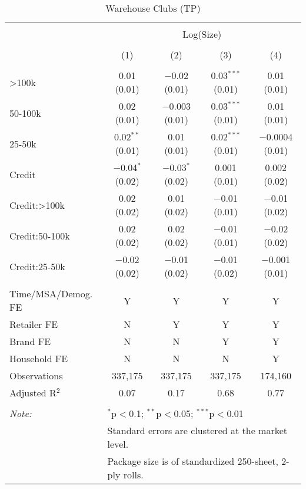 
\begin{table}[!htbp] \centering 
  \caption{Warehouse Clubs (TP)} 
  \label{tab:packageSizeWarehouseLiq} 
\begin{tabular}{@{\extracolsep{5pt}}lcccc} 
\\[-1.8ex]\hline 
\hline \\[-1.8ex] 
 & \multicolumn{4}{c}{Log(Size)} \\ 
\\[-1.8ex] & (1) & (2) & (3) & (4)\\ 
\hline \\[-1.8ex] 
 >100k & 0.01 (0.01) & $-$0.02 (0.01) & 0.03$^{***}$ (0.01) & 0.01 (0.01) \\ 
  50-100k & 0.02 (0.01) & $-$0.003 (0.01) & 0.03$^{***}$ (0.01) & 0.01 (0.01) \\ 
  25-50k & 0.02$^{**}$ (0.01) & 0.01 (0.01) & 0.02$^{***}$ (0.01) & $-$0.0004 (0.01) \\ 
  Credit & $-$0.04$^{*}$ (0.02) & $-$0.03$^{*}$ (0.02) & 0.001 (0.01) & 0.002 (0.02) \\ 
  Credit:>100k & 0.02 (0.02) & 0.01 (0.02) & $-$0.01 (0.01) & $-$0.01 (0.02) \\ 
  Credit:50-100k & 0.02 (0.02) & 0.02 (0.02) & $-$0.01 (0.01) & $-$0.02 (0.02) \\ 
  Credit:25-50k & $-$0.02 (0.02) & $-$0.01 (0.02) & $-$0.01 (0.02) & $-$0.001 (0.01) \\ 
 \hline \\[-1.8ex] 
Time/MSA/Demog. FE & Y & Y & Y & Y \\ 
Retailer FE & N & Y & Y & Y \\ 
Brand FE & N & N & Y & Y \\ 
Household FE & N & N & N & Y \\ 
Observations & 337,175 & 337,175 & 337,175 & 174,160 \\ 
Adjusted R$^{2}$ & 0.07 & 0.17 & 0.68 & 0.77 \\ 
\hline 
\hline \\[-1.8ex] 
\textit{Note:}  & \multicolumn{4}{l}{$^{*}$p$<$0.1; $^{**}$p$<$0.05; $^{***}$p$<$0.01} \\ 
 & \multicolumn{4}{l}{Standard errors are clustered at the market level.} \\ 
 & \multicolumn{4}{l}{Package size is of standardized 250-sheet, 2-ply rolls.} \\ 
\end{tabular} 
\end{table} 
